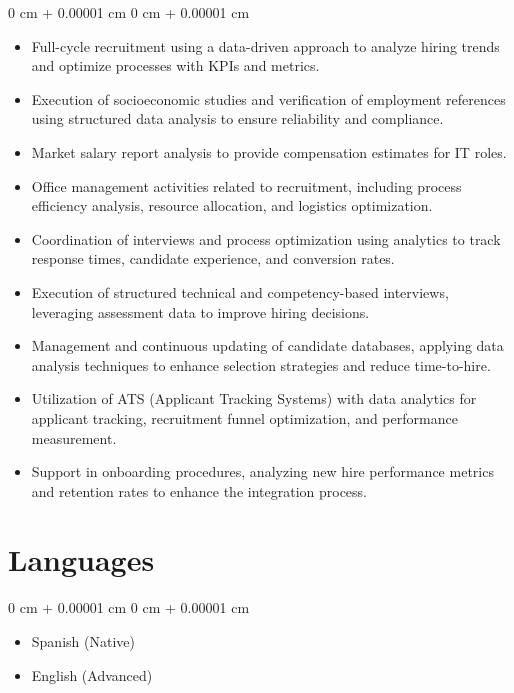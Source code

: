 \documentclass[10pt, a4paper]{article}
\newenvironment{highlights}{
    \begin{itemize}[
        topsep=0.10 cm,
        parsep=0.10 cm,
        partopsep=0pt,
        itemsep=0pt,
        leftmargin=0 cm + 10pt
    ]
}{
    \end{itemize}
} %
\newenvironment{highlightsforbulletentries}{
    \begin{itemize}[
        topsep=0.10 cm,
        parsep=0.10 cm,
        partopsep=0pt,
        itemsep=0pt,
        leftmargin=10pt
    ]
}{
    \end{itemize}
} %
\newenvironment{onecolentry}{
    \begin{adjustwidth}{
        0 cm + 0.00001 cm
    }{
        0 cm + 0.00001 cm
    }
}{
    \end{adjustwidth}
} %
\begin{document}
        \vspace{0.10 cm}
        \begin{onecolentry}
            \begin{highlights}
                \item Full-cycle recruitment using a data-driven approach to analyze hiring trends and optimize processes with KPIs and metrics.
                \item Execution of socioeconomic studies and verification of employment references using structured data analysis to ensure reliability and compliance.
                \item Market salary report analysis to provide compensation estimates for IT roles.
                \item Office management activities related to recruitment, including process efficiency analysis, resource allocation, and logistics optimization.
                \item Coordination of interviews and process optimization using analytics to track response times, candidate experience, and conversion rates.
                \item Execution of structured technical and competency-based interviews, leveraging assessment data to improve hiring decisions.
                \item Management and continuous updating of candidate databases, applying data analysis techniques to enhance selection strategies and reduce time-to-hire.
                \item Utilization of ATS (Applicant Tracking Systems) with data analytics for applicant tracking, recruitment funnel optimization, and performance measurement.
                \item Support in onboarding procedures, analyzing new hire performance metrics and retention rates to enhance the integration process.
            \end{highlights}
        \end{onecolentry}


        \vspace{0.2 cm}

    


    \section{Languages}
        \begin{samepage}
            \begin{onecolentry}
                \begin{highlightsforbulletentries}
                \item Spanish (Native)
                \item English (Advanced)
                \end{highlightsforbulletentries}
            \end{onecolentry}
        \end{samepage}
         
\end{document}
